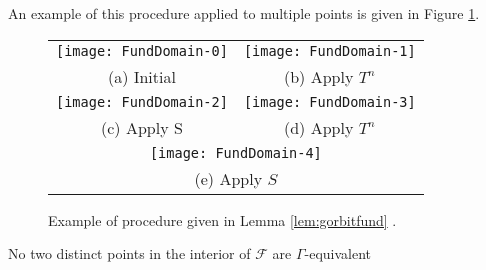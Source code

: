 An example of this procedure applied to multiple points is given in Figure \ref{fig:procedure}.
\begin{figure}[!htbp]
\begin{tabular}{cc}
  \texttt{[image: FundDomain-0]} &   \texttt{[image: FundDomain-1]} \\
(a) Initial & (b) Apply $T^n$ \\[6pt]
 \texttt{[image: FundDomain-2]} &   \texttt{[image: FundDomain-3]} \\
(c) Apply S & (d) Apply $T^n$  \\[6pt]
\multicolumn{2}{c}{\texttt{[image: FundDomain-4]} }\\
\multicolumn{2}{c}{(e) Apply $S$}
\end{tabular}
\caption{Example of procedure given in Lemma \ref{lem:gorbitfund} . }
\label{fig:procedure}

\end{figure}

\begin{lemma}\label{lem:noDistinctInteriorEquiv}
No two distinct points in the interior of $\mathcal{F}$ are $\Gamma$-equivalent
\end{lemma}

